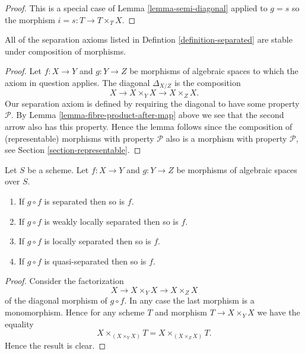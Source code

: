 \begin{proof}
This is a special case of Lemma \ref{lemma-semi-diagonal} applied to
$g = s$ so the morphism $i = s : T \to T \times_T X$.
\end{proof}

\begin{lemma}
\label{lemma-composition-separated}
All of the separation axioms listed in Defintion \ref{definition-separated}
are stable under composition of morphisms.
\end{lemma}

\begin{proof}
Let $f : X \to Y$ and $g : Y \to Z$ be morphisms of algebraic spaces
to which the axiom in question applies.
The diagonal $\Delta_{X/Z}$ is the composition
$$
X \longrightarrow X \times_Y X \longrightarrow X \times_Z X.
$$
Our separation axiom is defined by requiring the diagonal
to have some property $\mathcal{P}$. By
Lemma \ref{lemma-fibre-product-after-map} above we see that
the second arrow also has this property. Hence the lemma follows
since the composition of (representable) morphisms with property
$\mathcal{P}$ also is a morphism with property $\mathcal{P}$, see
Section \ref{section-representable}.
\end{proof}

\begin{lemma}
\label{lemma-compose-after-separated}
Let $S$ be a scheme.
Let $f : X \to Y$ and $g : Y \to Z$ be morphisms of algebraic spaces over $S$.
\begin{enumerate}
\item If $g \circ f$ is separated then so is $f$.
\item If $g \circ f$ is weakly locally separated then so is $f$.
\item If $g \circ f$ is locally separated then so is $f$.
\item If $g \circ f$ is quasi-separated then so is $f$.
\end{enumerate}
\end{lemma}

\begin{proof}
Consider the factorization
$$
X \to X \times_Y X \to X \times_Z X
$$
of the diagonal morphism of $g \circ f$. In any case the last morphism
is a monomorphism. Hence for any scheme $T$ and morphism
$T \to X \times_Y X$ we have the equality
$$
X \times_{(X \times_Y X)} T = X \times_{(X \times_Z X)} T.
$$
Hence the result is clear.
\end{proof}

